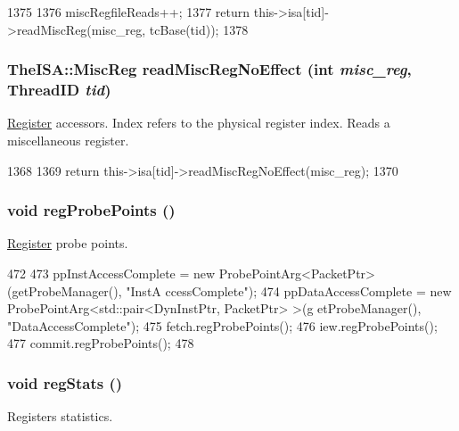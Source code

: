 \begin{DoxyCode}
1375 {
1376     miscRegfileReads++;
1377     return this->isa[tid]->readMiscReg(misc_reg, tcBase(tid));
1378 }
\end{DoxyCode}
\hypertarget{classFullO3CPU_adab97969b95d7b02e858364997dd7968}{
\subsubsection[{readMiscRegNoEffect}]{\setlength{\rightskip}{0pt plus 5cm}TheISA::MiscReg readMiscRegNoEffect (int {\em misc\_\-reg}, \/  {\bf ThreadID} {\em tid})}}
\label{classFullO3CPU_adab97969b95d7b02e858364997dd7968}
\hyperlink{classRegister}{Register} accessors. Index refers to the physical register index. Reads a miscellaneous register. 


\begin{DoxyCode}
1368 {
1369     return this->isa[tid]->readMiscRegNoEffect(misc_reg);
1370 }
\end{DoxyCode}
\hypertarget{classFullO3CPU_aa2dab17a363fd4307274d579796adcf7}{
\subsubsection[{regProbePoints}]{\setlength{\rightskip}{0pt plus 5cm}void regProbePoints ()}}
\label{classFullO3CPU_aa2dab17a363fd4307274d579796adcf7}
\hyperlink{classRegister}{Register} probe points. 


\begin{DoxyCode}
472 {
473     ppInstAccessComplete = new ProbePointArg<PacketPtr>(getProbeManager(), "InstA
      ccessComplete");
474     ppDataAccessComplete = new ProbePointArg<std::pair<DynInstPtr, PacketPtr> >(g
      etProbeManager(), "DataAccessComplete");
475     fetch.regProbePoints();
476     iew.regProbePoints();
477     commit.regProbePoints();
478 }
\end{DoxyCode}
\hypertarget{classFullO3CPU_a4dc637449366fcdfc4e764cdf12d9b11}{
\subsubsection[{regStats}]{\setlength{\rightskip}{0pt plus 5cm}void regStats ()}}
\label{classFullO3CPU_a4dc637449366fcdfc4e764cdf12d9b11}
Registers statistics. 

